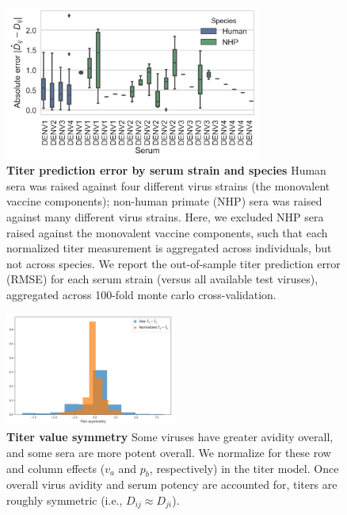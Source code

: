 \documentclass[11pt,oneside,letterpaper]{article}
\begin{document}
\begin{figure}[ht]
\centering
	\includegraphics[width=0.75\textwidth]{../figures/png/titer_species_error.png}
	\caption{\textbf{Titer prediction error by serum strain and species}
  Human sera was raised against four different virus strains (the monovalent vaccine components); non-human primate (NHP) sera was raised against many different virus strains.
  Here, we excluded NHP sera raised against the monovalent vaccine components, such that each normalized titer measurement is aggregated across individuals, but not across species.
  We report the out-of-sample titer prediction error (RMSE) for each serum strain (versus all available test viruses), aggregated across 100-fold monte carlo cross-validation.
	}
	\label{species_titers}
\end{figure}


\begin{figure}[ht]
  \centering
  \includegraphics[width=0.5\textwidth]{../figures/png/titer_asymmetry.png}
  \caption{\textbf{Titer value symmetry}
  Some viruses have greater avidity overall, and some sera are more potent overall.
  We normalize for these row and column effects ($v_a$ and $p_b$, respectively) in the titer model.
  Once overall virus avidity and serum potency are accounted for, titers are roughly symmetric (i.e., $D_{ij} \approx D_{ji}$).
  }
\label{titer_asymmetry}
\end{figure}
\end{document}
